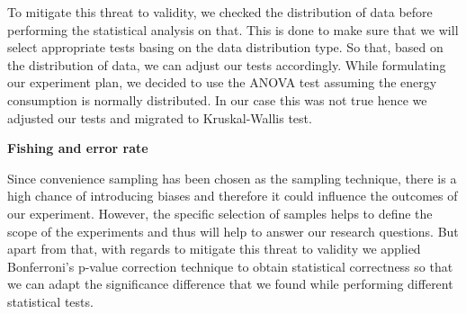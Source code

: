 To mitigate this threat to validity, we checked the distribution of data before performing the statistical analysis on that. This is done to make sure that we will select appropriate tests basing on the data distribution type. So that, based on the distribution of data, we can adjust our tests accordingly. While formulating our experiment plan, we decided to use the ANOVA test assuming the energy consumption is normally distributed. In our case this was not true hence we adjusted our tests and migrated to Kruskal-Wallis test. \newline

\textbf{Fishing and error rate}

Since convenience sampling has been chosen as the sampling technique, there is a high chance of introducing biases and therefore it could influence the outcomes of our experiment. However, the specific selection of samples helps to define the scope of the experiments and thus will help to answer our research questions. But apart from that, with regards to mitigate this threat to validity we applied Bonferroni's p-value correction technique to obtain statistical correctness so that we can adapt the significance difference that we found while performing different statistical tests. 
